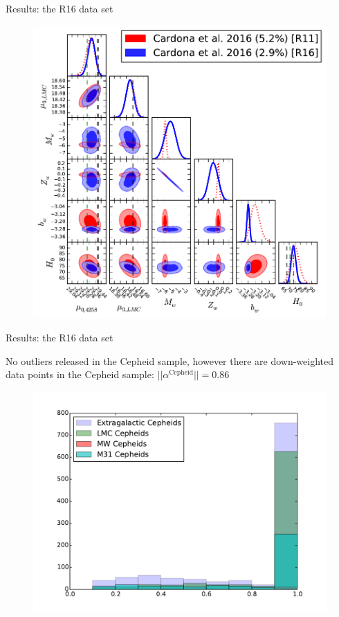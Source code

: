 \documentclass{beamer}
\newcommand{\Cepheid}{\mathrm{Cepheid}}
\begin{document}
\begin{frame}{Results: the R16 data set}
\begin{figure}
\includegraphics[scale=0.5]{../figures/chapter-h0/triangle_plot_fit_29_44.pdf} 
\end{figure}
\end{frame}

\begin{frame}{Results: the R16 data set}
\begin{center}
No outliers released in the Cepheid sample, however there are down-weighted data points in the Cepheid sample: $|| \alpha^{\Cepheid}|| = 0.86$
\end{center}
\begin{figure}
\includegraphics[scale=0.4]{../figures/chapter-h0/effective_HP_histogram_R16.pdf} 
\end{figure}
\end{frame}
\end{document}
